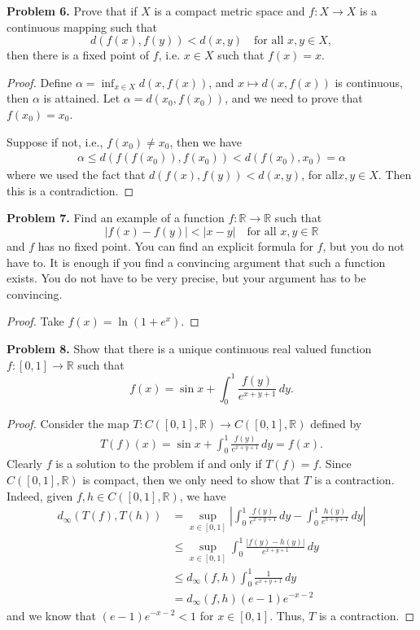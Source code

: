 \documentclass[12pt]{article}
\theoremstyle{definition}
\theoremstyle{definition}
\numberwithin{equation}{subsection}
\begin{document}
\medskip

\noindent
{\bf Problem 6.}
Prove that if $X$ is a compact metric space and $f:X\to X$
is a continuous mapping such that
$$
d(f(x),f(y))<d(x,y)
\quad
\mbox{for all $x,y\in X$},
$$
then there is a fixed point of $f$, i.e. $x\in X$ such that $f(x)=x$.
\begin{proof}
Define $\alpha = \inf_{x\in X} d(x, f(x))$, and $x \mapsto d(x,f(x))$ is continuous, then $\alpha$ is attained. Let $\alpha = d(x_0,f(x_0))$, and we need to prove that $f(x_0) = x_0$.

Suppose if not, i.e., $f(x_0) \neq x_0$, then we have
\begin{align*}
    \alpha \leq d(f(f(x_0)), f(x_0)) < d(f(x_0), x_0) = \alpha
\end{align*}
where we used the fact that $d(f(x),f(y))<d(x,y)$, for all$x,y\in X$. Then this is a contradiction.
\end{proof}

\medskip


\noindent
{\bf Problem 7.}
Find an example of a function $f:\mathbb{R}\to\mathbb{R}$ such that
$$
|f(x)-f(y)|<|x-y|
\quad
\mbox{for all $x,y\in\mathbb{R}$}
$$
and $f$ has no fixed point. You can find an explicit formula for $f$, but
you do not have to. It is enough if you find a convincing argument
that such a function exists. You do not have to be very precise, but your argument
has to be convincing.
\begin{proof}
Take $f(x) = \ln\left(1 + e^x\right)$.
\end{proof}

\medskip


\noindent
{\bf Problem 8.}
Show that there is a unique continuous real valued
function $f:[0,1]\to\mathbb{R}$ such that
$$
f(x) = \sin x + \int_{0}^1 \frac{f(y)}{e^{x+y+1}}\, dy.
$$
\begin{proof}
Consider the map $T:C([0,1],\mathbb{R})\to C([0,1],\mathbb{R})$ defined by 
\begin{align*}
    T(f)(x) = \sin x + \int^1_0 \frac{f(y)}{e^{x+y+1}}\, dy = f(x).
\end{align*}
Clearly $f$ is a solution to the problem if and only if $T(f) = f$. Since $C([0,1],\mathbb{R})$ is compact, then we only need to show that $T$ is a contraction. Indeed, given $f,h\in C([0,1],\mathbb{R})$, we have
\begin{align*}
    d_\infty(T(f),T(h)) & = \sup_{x\in [0,1]} \left|\int_{0}^1 \frac{f(y)}{e^{x+y+1}}\, dy - \int_{0}^1 \frac{h(y)}{e^{x+y+1}}\, dy \right| \\
    & \leq \sup_{x\in [0,1]} \int^1_0 \frac{\left|f(y) - h(y)\right|}{e^{x+y+1}} \, dy \\
    & \leq d_\infty(f,h) \int^1_0 \frac{1}{e^{x+y+1}} \, dy \\
    & = d_\infty(f,h) (e-1)e^{-x-2}
\end{align*}
and we know that $(e-1)e^{-x-2} < 1$ for $x\in [0,1]$. Thus, $T$ is a contraction.
\end{proof}
\end{document}
